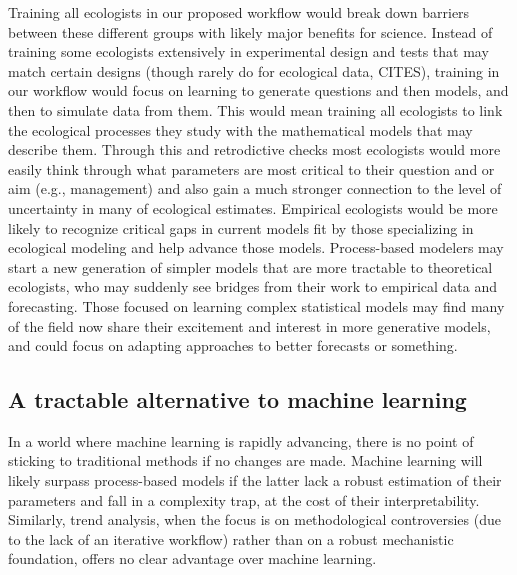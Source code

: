 \documentclass[11pt]{article}
\begin{document}
Training all ecologists in our proposed workflow would break down barriers between these different groups with likely major benefits for science. Instead of training some ecologists extensively in experimental design and tests that may match certain designs (though rarely do for ecological data, CITES), training in our workflow would focus on learning to generate questions and then models, and then to simulate data from them. This would mean training all ecologists to link the ecological processes they study with the mathematical models that may describe them. Through this and retrodictive checks most ecologists would more easily think through what parameters are most critical to their question and or aim (e.g., management) and also gain a much stronger connection to the level of uncertainty in many of ecological estimates. Empirical ecologists would be more likely to recognize critical gaps in current models fit by those specializing in ecological modeling and help advance those models. Process-based modelers may start a new generation of simpler models that are more tractable to theoretical ecologists, who may suddenly see bridges from their work to empirical data and forecasting. 
Those focused on learning complex statistical models may find many of the field now share their excitement and interest in more generative models, and could focus on adapting approaches to better forecasts or something.

\subsection{A tractable alternative to machine learning}

In a world where machine learning is rapidly advancing, there is no point of sticking to traditional methods if no changes are made. Machine learning will likely surpass process-based models if the latter lack a robust estimation of their parameters and fall in a complexity trap, at the cost of their interpretability. Similarly, trend analysis, when the focus is on methodological controversies (due to the lack of an iterative workflow) rather than on a robust mechanistic foundation, offers no clear advantage over machine learning.
\end{document}
